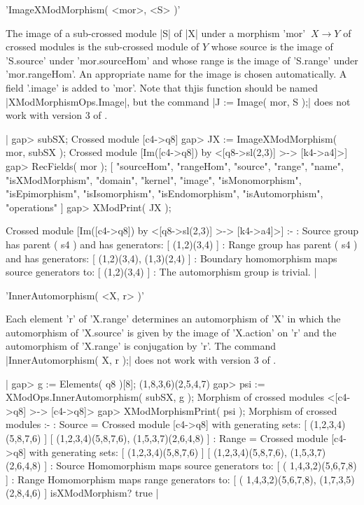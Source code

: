 %

'ImageXModMorphism( <mor>, <S> )'

The image of a sub-crossed module |S| of |X| under a morphism  
'mor' $\: X \to Y$  of crossed modules is the sub-crossed module of $Y$
whose source is the image of 'S.source' under 'mor.sourceHom'
and whose range is the image of 'S.range' under 'mor.rangeHom'.
An appropriate name for the image is chosen automatically.
A field '.image' is added to 'mor'.
Note that thjis function should be named
|XModMorphismOps.Image|, but the command |J := Image( mor, S );|
does not work with version 3 of {\GAP}.

|    gap> subSX;
    Crossed module [c4->q8]
    gap> JX := ImageXModMorphism( mor, subSX );
    Crossed module [Im([c4->q8]) by <[q8->sl(2,3)] >-> [k4->a4]>]
    gap> RecFields( mor );
    [ "sourceHom", "rangeHom", "source", "range", "name", "isXModMorphism",
       "domain", "kernel", "image", "isMonomorphism", "isEpimorphism",
       "isIsomorphism", "isEndomorphism", "isAutomorphism", "operations" ]
    gap> XModPrint( JX );
    
    Crossed module [Im([c4->q8]) by <[q8->sl(2,3)] >-> [k4->a4]>] :-
    : Source group has parent ( s4 )  and has generators:
      [ (1,2)(3,4) ]
    : Range group has parent ( s4 )  and has generators:
      [ (1,2)(3,4), (1,3)(2,4) ]
    : Boundary homomorphism maps source generators to:
      [ (1,2)(3,4) ]
    : The automorphism group is trivial.  |
    
%

'InnerAutomorphism( <X, r> )'

Each element 'r' of 'X.range' determines an automorphism of 'X'
in which the automorphism of 'X.source' is given by the image of
'X.action' on 'r' and the automorphism of 'X.range' is conjugation by 'r'.
The command  |InnerAutomorphism( X, r );|  does not work with 
version 3 of {\GAP}.

|    gap> g := Elements( q8 )[8];
    (1,8,3,6)(2,5,4,7)
    gap> psi := XModOps.InnerAutomorphism( subSX, g );
    Morphism of crossed modules <[c4->q8] >-> [c4->q8]>
    gap> XModMorphismPrint( psi );
    Morphism of crossed modules :- 
    : Source = Crossed module [c4->q8] with generating sets:
      [ (1,2,3,4)(5,8,7,6) ]
      [ (1,2,3,4)(5,8,7,6), (1,5,3,7)(2,6,4,8) ]
    :  Range = Crossed module [c4->q8] with generating sets:
      [ (1,2,3,4)(5,8,7,6) ]
      [ (1,2,3,4)(5,8,7,6), (1,5,3,7)(2,6,4,8) ] 
    : Source Homomorphism maps source generators to:
      [ ( 1,4,3,2)(5,6,7,8) ]
    : Range Homomorphism maps range generators to:
      [ ( 1,4,3,2)(5,6,7,8), (1,7,3,5)(2,8,4,6) ]
      isXModMorphism? true   |
    
